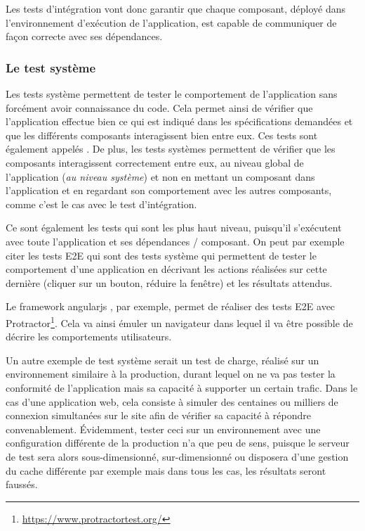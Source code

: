 
Les tests d'intégration vont donc garantir que chaque composant, déployé dans l'environnement d'exécution de l'application, est capable de communiquer de façon correcte avec ses dépendances.

\subsubsection{Le test système}

Les tests système permettent de tester le comportement de l'application sans forcément avoir connaissance du code. Cela permet ainsi de vérifier que l'application effectue bien ce qui est indiqué dans les spécifications demandées et que les différents composants interagissent bien entre eux. Ces tests sont également appelés . De plus, les tests systèmes permettent de vérifier que les composants interagissent correctement entre eux, au niveau global de l'application (\emph{au niveau système}) et non en mettant un composant dans l'application et en regardant son comportement avec les autres composants, comme c'est le cas avec le test d'intégration.

Ce sont également les tests qui sont les plus haut niveau, puisqu'il s'exécutent avec toute l'application et ses dépendances / composant. On peut par exemple citer les tests \gls{E2E} qui sont des tests système qui permettent de tester le comportement d'une application en décrivant les actions réalisées sur cette dernière (cliquer sur un bouton, réduire la fenêtre) et les résultats attendus.

Le \gls{framework} \gls{angularjs} , par exemple, permet de réaliser des tests \gls{E2E} avec Protractor\footnote{\url{https://www.protractortest.org/}}. Cela va ainsi émuler un navigateur dans lequel il va être possible de décrire les comportements utilisateurs. 

Un autre exemple de test système serait un test de charge, réalisé sur un environnement similaire à la production, durant lequel on ne va pas tester la conformité de l'application mais sa capacité à supporter un certain trafic. Dans le cas d'une application web, cela consiste à simuler des centaines ou milliers de connexion simultanées sur le site afin de vérifier sa capacité à répondre convenablement. Évidemment, tester ceci sur un environnement avec une configuration différente de la production n'a que peu de sens, puisque le serveur de test sera alors sous-dimensionné, sur-dimensionné ou disposera d'une gestion du cache différente par exemple mais dans tous les cas, les résultats seront faussés.

